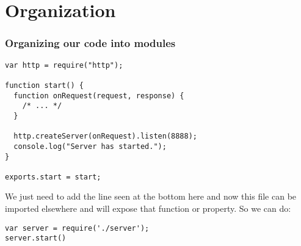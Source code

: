 \documentclass[ignorenonframetext,]{beamer}
\begin{document}
\section{Organization}

\begin{frame}[fragile]\frametitle{Organizing our code into modules}

\begin{verbatim}
var http = require("http");

function start() {
  function onRequest(request, response) {
    /* ... */
  }

  http.createServer(onRequest).listen(8888);
  console.log("Server has started.");
}

exports.start = start;
\end{verbatim}
We just need to add the line seen at the bottom here and now this file
can be imported elsewhere and will expose that function or property. So
we can do:

\begin{verbatim}
var server = require('./server');
server.start() 
\end{verbatim}
\end{frame}
\end{document}
